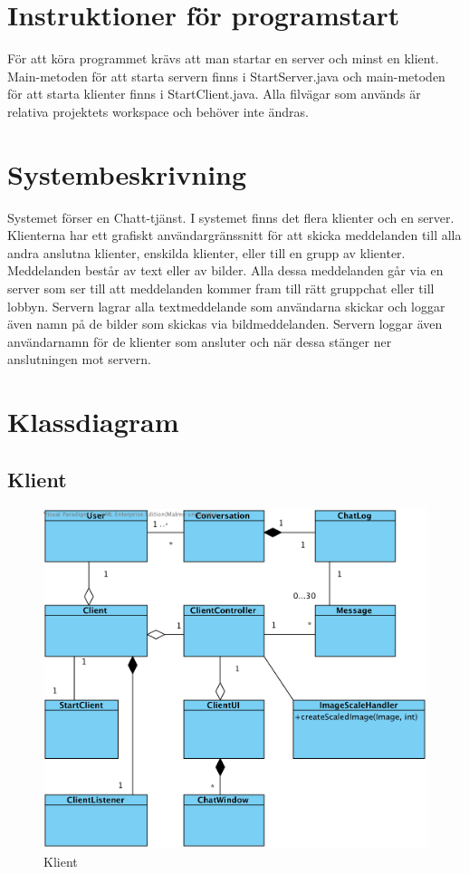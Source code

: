 \documentclass[a4paper,11pt]{article}
\begin{document}
\section{Instruktioner för programstart}
För att köra programmet krävs att man startar en server och minst en klient. Main-metoden för att starta servern finns i StartServer.java och main-metoden för att starta klienter finns i StartClient.java. Alla filvägar som används är relativa projektets workspace och behöver inte ändras.

\section{Systembeskrivning}

Systemet förser en Chatt-tjänst. I systemet finns det flera klienter och en server. Klienterna har ett grafiskt användargränssnitt för att skicka meddelanden till alla andra anslutna klienter, enskilda klienter, eller till en grupp av klienter. Meddelanden består av text eller av bilder. Alla dessa meddelanden går via en server som ser till att meddelanden kommer fram till rätt gruppchat eller till lobbyn. Servern lagrar alla textmeddelande som användarna skickar och loggar även namn på de bilder som skickas via bildmeddelanden. Servern loggar även användarnamn för de klienter som ansluter och när dessa stänger ner anslutningen mot servern.

\section{Klassdiagram}
\subsection{Klient}
	\begin{figure}[H]
		\centering
		\includegraphics[width=\textwidth]{diagram/Client.png}
		\caption{Klient}

	\end{figure}
\end{document}

